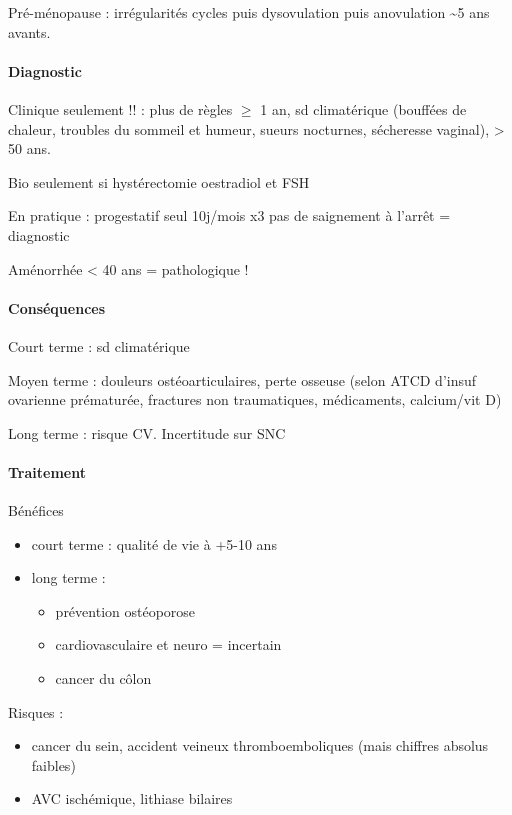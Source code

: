 \documentclass[11pt]{article}
\begin{document}
Pré-ménopause : irrégularités cycles puis dysovulation puis anovulation \textasciitilde{}5 ans
avants.

\paragraph{Diagnostic}
\label{sec:orge36f298}
Clinique seulement !! : plus de règles \(\ge\) 1 an, sd climatérique (bouffées de chaleur, troubles du
sommeil et humeur, sueurs nocturnes, sécheresse vaginal), \female > 50 ans. 

Bio seulement si hystérectomie \thus \dec oestradiol et \inc FSH

En pratique : progestatif seul 10j/mois x3 \thus pas de saignement à l'arrêt =
diagnostic

Aménorrhée < 40 ans = pathologique !

\paragraph{Conséquences}
\label{sec:org48e86f2}
Court terme : sd climatérique

Moyen terme : douleurs ostéoarticulaires, \inc perte osseuse (selon ATCD d'insuf
ovarienne prématurée, fractures non traumatiques, médicaments, calcium/vit D)

Long terme : \inc risque CV. Incertitude sur SNC

\paragraph{Traitement}
\label{sec:orgcd3e2ca}
Bénéfices
\begin{itemize}
\item court terme : qualité de vie à +5-10 ans
\item long terme :
\begin{itemize}
\item prévention ostéoporose
\item cardiovasculaire et neuro = incertain
\item cancer du côlon
\end{itemize}
\end{itemize}
Risques :
\begin{itemize}
\item \inc cancer du sein, accident veineux thromboemboliques (mais chiffres absolus
faibles)
\item \inc AVC ischémique, lithiase bilaires
\end{itemize}
\end{document}
